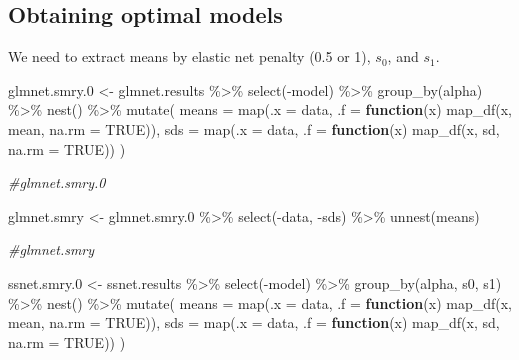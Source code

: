 \documentclass[
]{article}
\newenvironment{Shaded}{\begin{snugshade}}{\end{snugshade}}
\newcommand{\AttributeTok}[1]{\textcolor[rgb]{0.77,0.63,0.00}{#1}}
\newcommand{\CommentTok}[1]{\textcolor[rgb]{0.56,0.35,0.01}{\textit{#1}}}
\newcommand{\ConstantTok}[1]{\textcolor[rgb]{0.00,0.00,0.00}{#1}}
\newcommand{\ControlFlowTok}[1]{\textcolor[rgb]{0.13,0.29,0.53}{\textbf{#1}}}
\newcommand{\FloatTok}[1]{\textcolor[rgb]{0.00,0.00,0.81}{#1}}
\newcommand{\FunctionTok}[1]{\textcolor[rgb]{0.00,0.00,0.00}{#1}}
\newcommand{\NormalTok}[1]{#1}
\newcommand{\OtherTok}[1]{\textcolor[rgb]{0.56,0.35,0.01}{#1}}
\newcommand{\SpecialCharTok}[1]{\textcolor[rgb]{0.00,0.00,0.00}{#1}}
\begin{document}
\hypertarget{obtaining-optimal-models}{%
\subsection{Obtaining optimal models}\label{obtaining-optimal-models}}

We need to extract means by elastic net penalty (0.5 or 1), \(s_0\), and
\(s_1\).

\begin{Shaded}
\begin{Highlighting}[]
\NormalTok{glmnet.smry}\FloatTok{.0} \OtherTok{\textless{}{-}}\NormalTok{ glmnet.results }\SpecialCharTok{\%\textgreater{}\%} 
  \FunctionTok{select}\NormalTok{(}\SpecialCharTok{{-}}\NormalTok{model) }\SpecialCharTok{\%\textgreater{}\%}
  \FunctionTok{group\_by}\NormalTok{(alpha) }\SpecialCharTok{\%\textgreater{}\%}
  \FunctionTok{nest}\NormalTok{() }\SpecialCharTok{\%\textgreater{}\%}
  \FunctionTok{mutate}\NormalTok{(}
    \AttributeTok{means =} \FunctionTok{map}\NormalTok{(}\AttributeTok{.x =}\NormalTok{ data, }\AttributeTok{.f =} \ControlFlowTok{function}\NormalTok{(x) }\FunctionTok{map\_df}\NormalTok{(x, mean, }\AttributeTok{na.rm =} \ConstantTok{TRUE}\NormalTok{)),}
    \AttributeTok{sds =} \FunctionTok{map}\NormalTok{(}\AttributeTok{.x =}\NormalTok{ data, }\AttributeTok{.f =} \ControlFlowTok{function}\NormalTok{(x) }\FunctionTok{map\_df}\NormalTok{(x, sd, }\AttributeTok{na.rm =} \ConstantTok{TRUE}\NormalTok{))}
\NormalTok{    )}

\CommentTok{\#glmnet.smry.0}

\NormalTok{glmnet.smry }\OtherTok{\textless{}{-}}\NormalTok{ glmnet.smry}\FloatTok{.0} \SpecialCharTok{\%\textgreater{}\%} 
  \FunctionTok{select}\NormalTok{(}\SpecialCharTok{{-}}\NormalTok{data, }\SpecialCharTok{{-}}\NormalTok{sds) }\SpecialCharTok{\%\textgreater{}\%}
  \FunctionTok{unnest}\NormalTok{(means)}

\CommentTok{\#glmnet.smry}

\NormalTok{ssnet.smry}\FloatTok{.0} \OtherTok{\textless{}{-}}\NormalTok{ ssnet.results }\SpecialCharTok{\%\textgreater{}\%}
  \FunctionTok{select}\NormalTok{(}\SpecialCharTok{{-}}\NormalTok{model) }\SpecialCharTok{\%\textgreater{}\%}
  \FunctionTok{group\_by}\NormalTok{(alpha, s0, s1) }\SpecialCharTok{\%\textgreater{}\%}
  \FunctionTok{nest}\NormalTok{() }\SpecialCharTok{\%\textgreater{}\%}
  \FunctionTok{mutate}\NormalTok{(}
    \AttributeTok{means =} \FunctionTok{map}\NormalTok{(}\AttributeTok{.x =}\NormalTok{ data, }\AttributeTok{.f =} \ControlFlowTok{function}\NormalTok{(x) }\FunctionTok{map\_df}\NormalTok{(x, mean, }\AttributeTok{na.rm =} \ConstantTok{TRUE}\NormalTok{)),}
    \AttributeTok{sds =} \FunctionTok{map}\NormalTok{(}\AttributeTok{.x =}\NormalTok{ data, }\AttributeTok{.f =} \ControlFlowTok{function}\NormalTok{(x) }\FunctionTok{map\_df}\NormalTok{(x, sd, }\AttributeTok{na.rm =} \ConstantTok{TRUE}\NormalTok{))}
\NormalTok{    )}


\end{Highlighting}
\end{Shaded}
\end{document}
